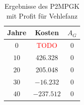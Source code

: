 \documentclass[11pt,a4paper]{article}
\newcommand{\TODO}{\textcolor{red}{TODO}}
\theoremstyle{my_th_style1}
\begin{document}
\begin{table}[!htbp]
	\centering
	\begin{tabular}{c|c|c}
		\centering
		Jahre & Kosten & $A_G$ \\	
		\hline
		$0$   	 & \TODO  &0  \\
		$10$ 	&  426.328 & 0  \\
		$20$   	&  205.048  & 0  \\
		$30$    & $-16.232$& 0  \\
		$40$    &  $-237.512$ & 0 \\
	\end{tabular}
	\label{P2MPGKProfitV}
	\caption{Ergebnisse des P2MPGK mit Profit f\"ur Vehlefanz} 
\end{table}


\thispagestyle{empty}
\end{document}
